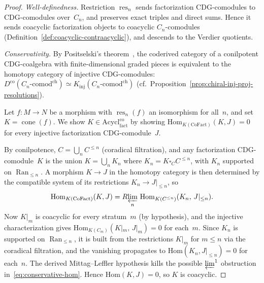 \begin{proof}
\emph{Well-definedness.}
Restriction $\operatorname{res}_n$ sends factorization
CDG-comodules to CDG-comodules over~$C_n$, and preserves exact
triples and direct sums. Hence it sends coacyclic factorization
objects to coacyclic $C_n$-comodules
(Definition~\ref{def:coacyclic-contraacyclic}), and descends to
the Verdier quotients.

\emph{Conservativity.}
By Positselski's theorem~\cite[\S5.4]{Positselski11},
the coderived category of a conilpotent CDG-coalgebra with
finite-dimensional graded pieces is equivalent to the homotopy
category of injective CDG-comodules:
$D^{\mathrm{co}}(C_n\text{-}\mathrm{comod}^{\mathrm{ch}})
\simeq K_{\mathrm{inj}}(C_n\text{-}\mathrm{comod}^{\mathrm{ch}})$
(cf.\ Proposition~\ref{prop:chiral-inj-proj-resolutions}).

Let $f \colon M \to N$ be a morphism with
$\operatorname{res}_n(f)$ an isomorphism for all~$n$, and set
$K = \operatorname{cone}(f)$. We show
$K \in \mathrm{Acycl}^{\mathrm{co}}_{\mathrm{fact}}$ by showing
$\mathrm{Hom}_{K(\mathrm{CoFact})}(K, J) = 0$ for every
injective factorization CDG-comodule~$J$.

By conilpotence, $C = \bigcup_n C^{\leq n}$ (coradical
filtration), and any factorization CDG-comodule~$K$ is the union
$K = \bigcup_n K_n$ where $K_n = K \square_C C^{\leq n}$, with
$K_n$ supported on $\operatorname{Ran}_{\leq n}$. A morphism
$K \to J$ in the homotopy category is then determined by the
compatible system of its restrictions
$K_n \to J|_{\leq n}$, so
\begin{equation}\label{eq:conservative-hom}
\mathrm{Hom}_{K(\mathrm{CoFact})}(K, J)
= R\!\varprojlim_n\,
\mathrm{Hom}_{K(C^{\leq n})}(K_n,\, J|_{\leq n}).
\end{equation}
Now $K|_m$ is coacyclic for every stratum~$m$ (by hypothesis),
and the injective characterization gives
$\mathrm{Hom}_{K(C_m)}(K|_m,\, J|_m) = 0$ for each~$m$. Since
$K_n$ is supported on $\operatorname{Ran}_{\leq n}$, it is built
from the restrictions $K|_m$ for $m \leq n$ via the coradical
filtration, and the vanishing propagates to
$\mathrm{Hom}(K_n, J|_{\leq n}) = 0$ for each~$n$.
The derived Mittag--Leffler hypothesis kills the possible
$\varprojlim^1$ obstruction in~\eqref{eq:conservative-hom}. Hence
$\mathrm{Hom}(K, J) = 0$, so $K$ is coacyclic.
\end{proof}

